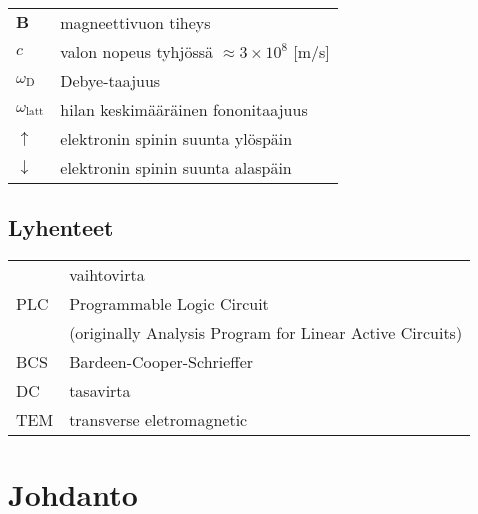 \documentclass[finnish,12pt]{article}
\begin{document}
	\begin{tabular}{ll}
	$\mathbf{B}$  & magneettivuon tiheys  \\
	$c$              & valon nopeus tyhjössä $\approx 3\times10^8$ [m/s]\\
	$\omega_{\mathrm{D}}$    & Debye-taajuus \\
	$\omega_{\mathrm{latt}}$ & hilan keskimääräinen fononitaajuus \\
	$\uparrow$       & elektronin spinin suunta ylöspäin\\
	$\downarrow$     & elektronin spinin suunta alaspäin
	\end{tabular}

	\subsection*{Lyhenteet}

	\begin{tabular}{ll}
         & vaihtovirta \\
PLC      & Programmable Logic Circuit \\
           & (originally Analysis Program for Linear Active Circuits) \\
BCS        & Bardeen-Cooper-Schrieffer \\ %
DC         & tasavirta \\
TEM        & transverse eletromagnetic
	\end{tabular}


	\cleardoublepage
	\storeinipagenumber
	\setcounter{page}{1}

	\section{Johdanto}
	\thispagestyle{empty}
\end{document}
